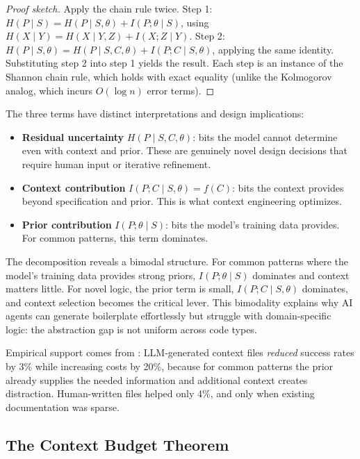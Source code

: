 \documentclass[11pt, a4paper, logo, copyright]{googledeepmind}
\begin{document}
\begin{proof}[Proof sketch]
Apply the chain rule twice. Step 1: $H(P \mid S) = H(P \mid S, \theta) + I(P; \theta \mid S)$, using $H(X \mid Y) = H(X \mid Y, Z) + I(X; Z \mid Y)$. Step 2: $H(P \mid S, \theta) = H(P \mid S, C, \theta) + I(P; C \mid S, \theta)$, applying the same identity. Substituting step 2 into step 1 yields the result. Each step is an instance of the Shannon chain rule, which holds with exact equality (unlike the Kolmogorov analog, which incurs $O(\log n)$ error terms).
\end{proof}

The three terms have distinct interpretations and design implications:

\begin{itemize}[nosep]
    \item \textbf{Residual uncertainty} $H(P \mid S, C, \theta)$: bits the model cannot determine even with context and prior. These are genuinely novel design decisions that require human input or iterative refinement.
    \item \textbf{Context contribution} $I(P; C \mid S, \theta) = f(C)$: bits the context provides beyond specification and prior. This is what context engineering optimizes.
    \item \textbf{Prior contribution} $I(P; \theta \mid S)$: bits the model's training data provides. For common patterns, this term dominates.
\end{itemize}

The decomposition reveals a bimodal structure. For common patterns where the model's training data provides strong priors, $I(P; \theta \mid S)$ dominates and context matters little. For novel logic, the prior term is small, $I(P; C \mid S, \theta)$ dominates, and context selection becomes the critical lever. This bimodality explains why AI agents can generate boilerplate effortlessly but struggle with domain-specific logic: the abstraction gap is not uniform across code types.

Empirical support comes from \citet{gloaguen2026agents}: LLM-generated context files \emph{reduced} success rates by 3\% while increasing costs by 20\%, because for common patterns the prior already supplies the needed information and additional context creates distraction. Human-written files helped only 4\%, and only when existing documentation was sparse.

\subsection{The Context Budget Theorem}
\end{document}
